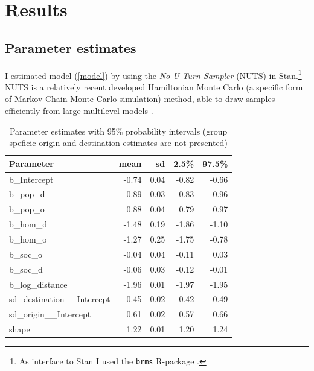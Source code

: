 \documentclass[fleqn,10pt]{SelfArx} %
\begin{document}
        \section{Results}

        \subsection{Parameter estimates}
        
        I estimated model (\ref{model}) by using the \emph{No U-Turn
          Sampler} (NUTS) in Stan.\footnote{As interface to Stan
          \citep[see for an overview article of
          Stan][]{carpenter2017stan} I used the \texttt{brms}
          R-package \citep{brms}.} NUTS is a relatively recent
        developed Hamiltonian Monte Carlo (a specific form of Markov
        Chain Monte Carlo simulation) method, able to draw samples
        efficiently from large multilevel models
        \citep{hoffman2014no}.

\begin{table}[ht]
  \centering
  \caption{Parameter estimates with 95\% probability intervals (group speficic origin and destination estimates are not presented)}
  \label{tab:coef}
  \begin{tabular}{lrrrr}
    \toprule
    Parameter & mean & sd & 2.5\% & 97.5\% \\ 
    \midrule
    b\_Intercept & -0.74 & 0.04 & -0.82 & -0.66 \\ 
    b\_pop\_d & 0.89 & 0.03 & 0.83 & 0.96 \\ 
    b\_pop\_o & 0.88 & 0.04 & 0.79 & 0.97 \\ 
    b\_hom\_d & -1.48 & 0.19 & -1.86 & -1.10 \\ 
    b\_hom\_o & -1.27 & 0.25 & -1.75 & -0.78 \\ 
    b\_soc\_o & -0.04 & 0.04 & -0.11 & 0.03 \\ 
    b\_soc\_d & -0.06 & 0.03 & -0.12 & -0.01 \\ 
    b\_log\_distance & -1.96 & 0.01 & -1.97 & -1.95 \\ 
    sd\_destination\_\_Intercept & 0.45 & 0.02 & 0.42 & 0.49 \\ 
    sd\_origin\_\_Intercept & 0.61 & 0.02 & 0.57 & 0.66 \\ 
    shape & 1.22 & 0.01 & 1.20 & 1.24 \\ 
    \bottomrule
\end{tabular}
\end{table}
\end{document}
